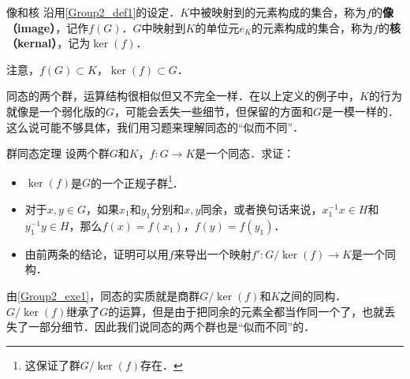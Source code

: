 \begin{definition}{像和核}
沿用\autoref{Group2_def1}的设定．$K$中被映射到的元素构成的集合，称为$f$的\textbf{像（image）}，记作$f(G)$．$G$中映射到$K$的单位元$e_K$的元素构成的集合，称为$f$的\textbf{核（kernal）}，记为$\ker(f)$．
\end{definition}

注意，$f(G)\subset K$，$\ker(f)\subset G$．

同态的两个群，运算结构很相似但又不完全一样．在以上定义的例子中，$K$的行为就像是一个弱化版的$G$，可能会丢失一些细节，但保留的方面和$G$是一模一样的．这么说可能不够具体，我们用习题来理解同态的“似而不同”．

\begin{exercise}{群同态定理}\label{Group2_exe1}
设两个群$G$和$K$，$f:G\rightarrow K$是一个同态．求证：
\begin{itemize}
\item $\ker(f)$是$G$的一个正规子群\footnote{这保证了群$G/\ker(f)$存在．}．
\item 对于$x, y\in G$，如果$x_1$和$y_1$分别和$x, y$同余，或者换句话来说，$x_1^{-1}x\in H$和$y_1^{-1}y\in H$，那么$f(x)=f(x_1)$，$f(y)=f(y_1)$．
\item 由前两条的结论，证明可以用$f$来导出一个映射$f': G/\ker(f)\rightarrow K$是一个同构．

\end{itemize}
\end{exercise}

由\autoref{Group2_exe1}，同态的实质就是商群$G/\ker(f)$和$K$之间的同构．$G/\ker(f)$继承了$G$的运算，但是由于把同余的元素全都当作同一个了，也就丢失了一部分细节．因此我们说同态的两个群也是“似而不同”的．
